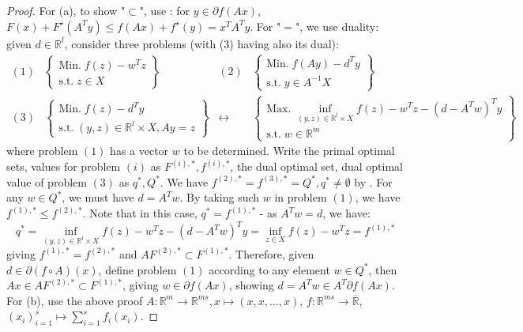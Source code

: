 \begin{proof}
	For (a), to show "$\subset$", use : for $y\in \partial f(Ax)$, $F(x)+F^\star(A^Ty)\leq f(Ax)+f^\star(y)=x^TA^Ty$. For "$=$", we use duality: given $d\in \mathbb{R}^l$, consider three problems (with (3) having also its dual):
	\[
		\begin{matrix}
			(1)                             &
			\begin{Bmatrix}
				\text{Min.}\;    f(z) - w^Tz \\
				\text{s.t.}\;  z\in X
			\end{Bmatrix} & (2)                                                & \begin{Bmatrix}
				                                                                     \text{Min.}\;    f(Ay)-d^Ty \\
				                                                                     \text{s.t.}\;  y\in A^{-1}X
			                                                                     \end{Bmatrix} \\
			(3)                             & \begin{Bmatrix}
				                                  \text{Min.}\;   f(z)-d^Ty \\
				                                  \text{s.t.}\;  (y,z)\in \mathbb{R}^l\times X, Ay=z
			                                  \end{Bmatrix} & \leftrightarrow                &
			\begin{Bmatrix}
				\text{Max.}\;    \inf_{(y,z)\in \mathbb{R}^l\times X}f(z)-w^Tz-(d-A^Tw)^Ty \\
				\text{s.t.}\;    w\in \mathbb{R}^m
			\end{Bmatrix}
		\end{matrix}
	\]
	where problem $(1)$ has a vector $w$ to be determined. Write the primal optimal sets, values for problem $(i)$ as $F^{(i),\ast},f^{(i),\ast}$, the dual optimal set, dual optimal value of problem $(3)$ as $q^\ast,Q^\ast$. We have $f^{(2),\ast}=f^{(3),\ast}=Q^{\ast},q^\ast\neq\emptyset$ by . For any $w\in Q^\ast$, we must have $d=A^Tw$. By taking such $w$ in problem $(1)$, we have $f^{(1),\ast}\leq f^{(2),\ast}$. Note that in this case, $q^\ast=f^{(1),\ast}$ - as $A^Tw=d$, we have:
	\[
		q^\ast = \inf_{(y,z)\in \mathbb{R}^l\times X}f(z)-w^Tz-(d-A^Tw)^Ty =  \inf_{z\in X}f(z)-w^Tz=f^{(1),\ast}
	\]
	giving $f^{(1),\ast}=f^{(2),\ast}$ and $AF^{(2),\ast}\subset F^{(1),\ast}$. Therefore, given $d\in \partial (f\circ A)(x)$, define problem $(1)$ according to any element $w\in Q^\ast$, then $Ax \in AF^{(2),\ast}\subset F^{(1),\ast}$, giving $w\in \partial f(Ax)$, showing $d=A^Tw\in A^T\partial f(Ax)$. For (b), use the above proof $A:\mathbb{R}^m\to \mathbb{R}^{ms},x\mapsto (x,x,\dotsc,x)$, $f:\mathbb{R}^{ms}\to \overline{\mathbb{R}}$, $(x_i)_{i=1}^s\mapsto \sum_{i=1}^sf_i(x_i)$.
\end{proof}

